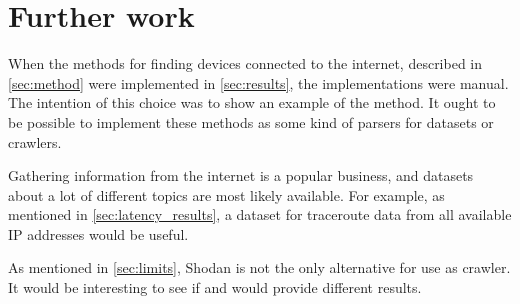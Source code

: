 \section{Further work} \label{sec:further_work}
When the methods for finding devices connected to the internet, described in \cref{sec:method} were implemented in \cref{sec:results}, the implementations were manual. The intention of this choice was to show an example of the method. It ought to be possible to implement these methods as some kind of parsers for datasets or crawlers.

Gathering information from the internet is a popular business, and datasets about a lot of different topics are most likely available. For example, as mentioned in \cref{sec:latency_results}, a dataset for traceroute data from all available IP addresses would be useful. 

As mentioned in \cref{sec:limits}, Shodan is not the only alternative for use as crawler. It would be interesting to see if \href{https://censys.io/}{\color{blue}{Censys}}\cite{censys} and \href{www.zoomeye.org}{\color{blue}{ZoomEye}}\cite{zoomeye} would provide different results.

